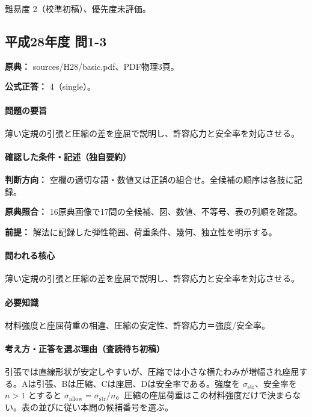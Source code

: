 \par 難易度 2（校準初稿）、優先度未評価。

\subsection{平成28年度 問1-3}
\label{q:h28-reg-basic-1-3}

\noindent\textbf{原典：} sources/H28/basic.pdf、PDF物理3頁。

\textbf{公式正答：} 4（single）。

\paragraph{問題の要旨} 薄い定規の引張と圧縮の差を座屈で説明し、許容応力と安全率を対応させる。

\paragraph{確認した条件・記述（独自要約）}\mbox{}\par

\noindent\textbf{判断方向：} 空欄の適切な語・数値又は正誤の組合せ。全候補の順序は各肢に記録。\par

\noindent\textbf{原典照合：} 16原典画像で17問の全候補、図、数値、不等号、表の列順を確認。\par

\noindent\textbf{前提：} 解法に記録した弾性範囲、荷重条件、幾何、独立性を明示する。\par

\paragraph{問われる核心} 薄い定規の引張と圧縮の差を座屈で説明し、許容応力と安全率を対応させる。

\paragraph{必要知識} 材料強度と座屈荷重の相違、圧縮の安定性、許容応力＝強度/安全率。

\paragraph{考え方・正答を選ぶ理由（査読待ち初稿）} 引張では直線形状が安定しやすいが、圧縮では小さな横たわみが増幅され座屈する。Aは引張、Bは圧縮、Cは座屈、Dは安全率である。強度を \(\sigma_{\mathrm{str}}\)、安全率を \(n>1\) とすると \(\sigma_{\mathrm{allow}}=\sigma_{\mathrm{str}}/n\)。圧縮の座屈荷重はこの材料強度だけで決まらない。表の並びに従い本問の候補番号を選ぶ。

